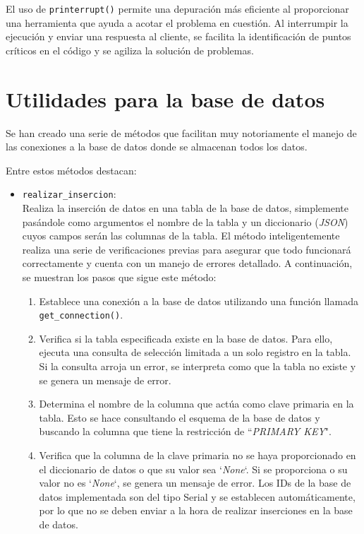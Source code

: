 \documentclass[12pt]{report}
\begin{document}
El uso de \texttt{printerrupt()} permite una depuración más eficiente al proporcionar una herramienta que ayuda a acotar el problema en cuestión. Al interrumpir la ejecución y enviar una respuesta al cliente, se facilita la identificación de puntos críticos en el código y se agiliza la solución de problemas.
\section{Utilidades para la base de datos}
Se han creado una serie de métodos que facilitan muy notoriamente el manejo de las conexiones a la base de datos donde se almacenan todos los datos.

Entre estos métodos destacan:
\begin{itemize}
    \item \texttt{realizar\_insercion}:
    \\
    Realiza la inserción de datos en una tabla de la base de datos, simplemente pasándole como argumentos el nombre de la tabla y un diccionario (\textit{JSON}) cuyos campos serán las columnas de la tabla. El método inteligentemente realiza una serie de verificaciones previas para asegurar que todo funcionará correctamente y cuenta con un manejo de errores detallado. A continuación, se muestran los pasos que sigue este método:

\begin{enumerate}
    \item Establece una conexión a la base de datos utilizando una función llamada \texttt{get\_connection()}.
    
    \item Verifica si la tabla especificada existe en la base de datos. Para ello, ejecuta una consulta de selección limitada a un solo registro en la tabla. Si la consulta arroja un error, se interpreta como que la tabla no existe y se genera un mensaje de error.
    
    \item Determina el nombre de la columna que actúa como clave primaria en la tabla. Esto se hace consultando el esquema de la base de datos y buscando la columna que tiene la restricción de ``\textit{PRIMARY KEY}".
    
    \item Verifica que la columna de la clave primaria no se haya proporcionado en el diccionario de datos o que su valor sea `\textit{None}`. Si se proporciona o su valor no es `\textit{None}`, se genera un mensaje de error. Los IDs de la base de datos implementada son del tipo Serial y se establecen automáticamente, por lo que no se deben enviar a la hora de realizar inserciones en la base de datos.
    

\end{enumerate}
\end{itemize}
\end{document}
